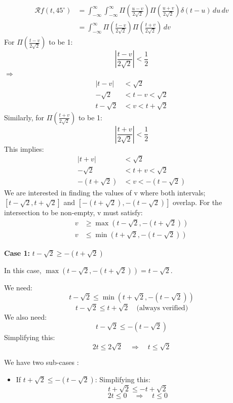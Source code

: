 \documentclass[12pt,twoside]{article}
\begin{document}
\begin{enumerate}
\begin{align*}
\mathcal{R}f(t, 45^\circ) &= \int_{-\infty}^{\infty} \int_{-\infty}^{\infty} \Pi\left(\frac{u-v}{2\sqrt{2}}\right) \Pi\left(\frac{u+v}{2\sqrt{2}}\right) \delta(t - u) \, du \, dv \\
&= \int_{-\infty}^{\infty} \Pi\left(\frac{t-v}{2\sqrt{2}}\right) \Pi\left(\frac{t+v}{2\sqrt{2}}\right) \, dv 
\end{align*}
For $ \Pi\left(\frac{t-v}{2\sqrt{2}}\right) $ to be 1:
\[
\left| \frac{t-v}{2\sqrt{2}} \right| < \frac{1}{2}
\]
$\Rightarrow$
\begin{align*}
\left| t-v \right| &< \sqrt{2} \\
-\sqrt{2} &< t - v < \sqrt{2} \\
t - \sqrt{2} &< v < t + \sqrt{2}
\end{align*}
Similarly, for $ \Pi\left(\frac{t+v}{2\sqrt{2}}\right) $ to be 1:
\[
\left| \frac{t+v}{2\sqrt{2}} \right| < \frac{1}{2}
\]
This implies:
\begin{align*}
\left| t+v \right| &< \sqrt{2} \\
-\sqrt{2} &< t + v < \sqrt{2} \\
 - \left( t + \sqrt{2} \right) &< v <  - \left( t - \sqrt{2} \right) 
\end{align*}
We are interested in finding the values of v where both intervals; $\left[t - \sqrt{2}  , t + \sqrt{2} \right]$ and $\left[- (t + \sqrt{2})  , - (t - \sqrt{2}) \right]$ overlap.
For the intersection to be non-empty, v  must satisfy:
\begin{align*}
v &\geq  \max(t -  \sqrt{2} , -(t +  \sqrt{2} )) \\
v &\leq \min(t +  \sqrt{2} , -(t -  \sqrt{2} ))
\end{align*}


\textbf{Case 1: } \( t - \sqrt{2} \geq -(t + \sqrt{2}) \)

In this case, \( \max(t - \sqrt{2}, -(t + \sqrt{2})) = t - \sqrt{2} \).

We need:
\[
t - \sqrt{2} \leq \min(t + \sqrt{2}, -(t - \sqrt{2}))
\]
 \[
    t - \sqrt{2} \leq t + \sqrt{2} \quad \text{(always verified)}
\]
  We also need:
    \[
    t - \sqrt{2} \leq -(t - \sqrt{2})
  \]
    Simplifying this:
    \[
    2t \leq 2\sqrt{2} \quad \Rightarrow \quad t \leq \sqrt{2}
    \]
  
We have two sub-cases :

\begin{itemize}
    \item If \( t + \sqrt{2} \leq -(t - \sqrt{2}) \):
    Simplifying this:
    \[
    t + \sqrt{2} \leq -t + \sqrt{2}
    \]
    \[
    2t \leq 0 \quad \Rightarrow \quad t \leq 0
    \]


\end{itemize}
\end{enumerate}
\end{document}
